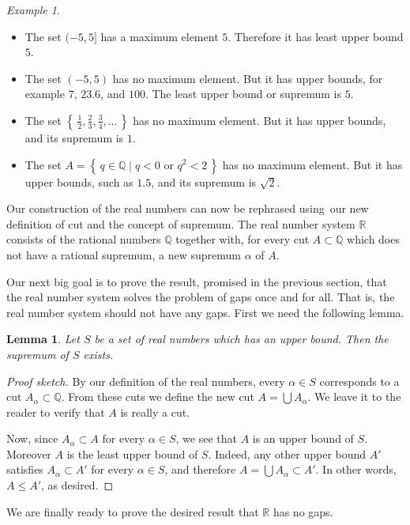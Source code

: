 \documentclass[11pt,oneside]{amsbook}
\newcommand{\set}[1]{\left\{\,#1\,\right\}}
\newcommand{\Q}{\mathbb Q}
\newcommand{\R}{\mathbb R}
\theoremstyle{definition}
\theoremstyle{plain}
\newtheorem{lemma}[theorem]{Lemma}
\theoremstyle{definition}
\theoremstyle{remark}
\newtheorem{example}[theorem]{Example}
\numberwithin{equation}{section}
\numberwithin{figure}{section}
\begin{document}
\begin{example}
  \begin{itemize}
  \item The set $(-5,5]$ has a maximum element $5$. Therefore it has least upper bound $5$.
  \item The set $(-5,5)$ has no maximum element. But it has upper bounds, for example $7$, $23.6$, and $100$. The least upper bound or supremum is $5$.
  \item The set $\set{\frac12,\frac23,\frac34,\ldots}$ has no maximum element. But it has upper bounds, and its supremum is $1$.
  \item The set $A=\set{q\in\Q\mid q<0\text{ or }q^2<2}$ has no maximum element. But it has upper bounds, such as $1.5$, and its supremum is $\sqrt2$.
  \end{itemize}
\end{example}

Our construction of the real numbers can now be rephrased using our new definition of cut and the concept of supremum. The real number system $\R$ consists of the rational numbers $\Q$ together with, for every cut $A\subset\Q$ which does not have a rational supremum, a new supremum $\alpha$ of $A$.

Our next big goal is to prove the result, promised in the previous section, that the real number system solves the problem of gaps once and for all. That is, the real number system should not have any gaps. First we need the following lemma.

\begin{lemma}
  Let $S$ be a set of real numbers which has an upper bound. Then the supremum of $S$ exists.
\end{lemma}

\begin{proof}[Proof sketch]
  By our definition of the real numbers, every $\alpha\in S$ corresponds to a cut $A_\alpha\subset\Q$. From these cuts we define the new cut $A=\bigcup A_\alpha$. We leave it to the reader to verify that $A$ is really a cut.

  Now, since $A_\alpha\subset A$ for every $\alpha\in S$, we see that $A$ is an upper bound of $S$. Moreover $A$ is the least upper bound of $S$. Indeed, any other upper bound $A'$ satisfies $A_\alpha\subset A'$ for every $\alpha\in S$, and therefore $A=\bigcup A_\alpha\subset A'$. In other words, $A\leq A'$, as desired.
\end{proof}

We are finally ready to prove the desired result that $\R$ has no gaps.
\end{document}
